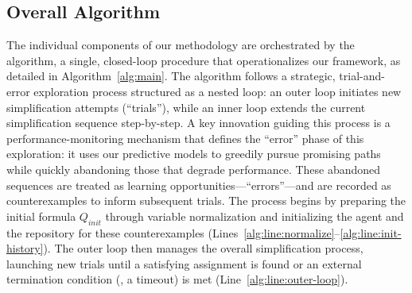 
\subsection{Overall Algorithm}
\label{sec:algorithm}

The individual components of our methodology are orchestrated by the \tool algorithm, a single, closed-loop procedure that operationalizes our framework, as detailed in Algorithm~\ref{alg:main}. The algorithm follows a strategic, trial-and-error exploration process structured as a nested loop: an outer loop initiates new simplification attempts (``trials''), while an inner loop extends the current simplification sequence step-by-step. A key innovation guiding this process is a performance-monitoring mechanism that defines the ``error'' phase of this exploration: it uses our predictive models to greedily pursue promising paths while quickly abandoning those that degrade performance. These abandoned sequences are treated as learning opportunities---``errors''---and are recorded as counterexamples to inform subsequent trials. The process begins by preparing the initial formula $Q_{init}$ through variable normalization and initializing the \SAC{} agent and the repository for these counterexamples (Lines~\ref{alg:line:normalize}--\ref{alg:line:init-history}). The outer loop then manages the overall simplification process, launching new trials until a satisfying assignment is found or an external termination condition (\eg, a timeout) is met (Line~\ref{alg:line:outer-loop}).

